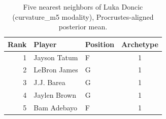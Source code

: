 \begin{table}[htbp]
  \centering\small
  \begin{tabular}{rllc}
    \toprule
    Rank & Player & Position & Archetype \\
    \midrule
    1 & Jayson Tatum & F & 1 \\
    2 & LeBron James & G & 1 \\
    3 & J.J. Barea & G & 1 \\
    4 & Jaylen Brown & G & 1 \\
    5 & Bam Adebayo & F & 1 \\
    \bottomrule
  \end{tabular}
  \caption{Five nearest neighbors of Luka Doncic (curvature_m5 modality), Procrustes-aligned posterior mean.}
  \label{tab:Luka_Doncic_neighbors_curvature_m5}
\end{table}

